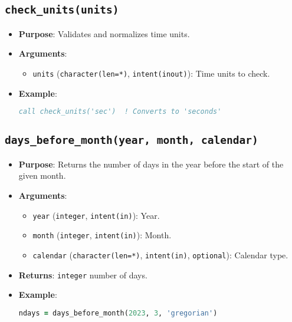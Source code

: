 \documentclass[12pt,a4paper]{report}
\begin{document}
\subsection{\texttt{check\_units(units)}}
\begin{itemize}
\item \textbf{Purpose}: Validates and normalizes time units.
\item \textbf{Arguments}:
\begin{itemize}
\item \texttt{units} (\texttt{character(len=*)}, \texttt{intent(inout)}): Time units to check.
\end{itemize}
\item \textbf{Example}:
\begin{lstlisting}[language=Fortran]
call check_units('sec')  ! Converts to 'seconds'
\end{lstlisting}
\end{itemize}

\subsection{\texttt{days\_before\_month(year, month, calendar)}}
\begin{itemize}
\item \textbf{Purpose}: Returns the number of days in the year before the start of the given month.
\item \textbf{Arguments}:
\begin{itemize}
\item \texttt{year} (\texttt{integer}, \texttt{intent(in)}): Year.
\item \texttt{month} (\texttt{integer}, \texttt{intent(in)}): Month.
\item \texttt{calendar} (\texttt{character(len=*)}, \texttt{intent(in)}, \texttt{optional}): Calendar type.
\end{itemize}
\item \textbf{Returns}: \texttt{integer} number of days.
\item \textbf{Example}:
\begin{lstlisting}[language=Fortran]
ndays = days_before_month(2023, 3, 'gregorian')
\end{lstlisting}
\end{itemize}
\end{document}
